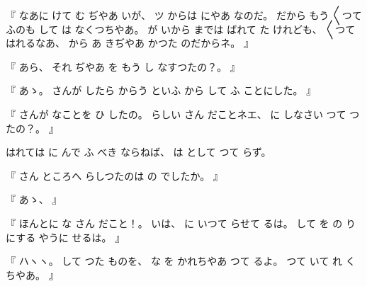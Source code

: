 %
『
なあに
けて
む
ぢやあ
いが、
%
ツ
からは
にやあ
なのだ。
%
だから
もう
〳〵つて
ふのも
して
は
なくつちやあ。
%
が
いから
までは
ばれて
た
けれども、
%
%
〳〵つて
はれるなあ、
%
から
あ
きぢやあ
かつた
のだからネ。
』

%
『
あら、
%
それ
ぢやあ
を
もう
し
なすつたの？。
』

%
『
あゝ。
%
さんが
したら
からう
といふ
から
して
ふ
ことにした。
』

%
『
さんが
なことを
ひ
したの。
%
らしい
さん
だことネエ、
%
に
しなさい
つて
つたの？。
』

%
はれては
に
んで
ふ
べき
ならねば、
%
は
として
つて
らず。

%
『
さん
ところへ
らしつたのは
の
でしたか。
』

%
『
あゝ、
』

%
『
ほんとに
な
さん
だこと！。
%
いは、
%
に
いつて
らせて
るは。
%
して
を
の
り
にする
やうに
せるは。
』

%
『
ハヽヽ。
%
して
つた
ものを、
%
な
を
かれちやあ
つて
るよ。
%
つて
いて
れ
くちやあ。
』

